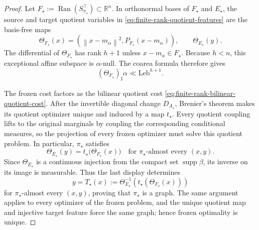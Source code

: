 \documentclass[11pt,a4paper]{article}
\theoremstyle{definition}
\theoremstyle{remark}
\newcommand{\R}{\mathbb R}
\newcommand{\supp}{\operatorname{supp}}
\newcommand{\Ran}{\operatorname{Ran}}
\newcommand{\norm}[1]{\left\lVert #1\right\rVert}
\begin{document}
\begin{proof}
Let \(F_\star:=\Ran(S_{\pi_\star}^\top)\subset\R^n\).  In orthonormal bases
of \(F_\star\) and \(E_\star\), the source and target quotient variables in
\eqref{eq:finite-rank-quotient-features} are the basis-free maps
\begin{equation*}
  \Theta_{F_\star}(x)
  =\left(\norm{x-m_\alpha}^2,P_{F_\star}(x-m_\alpha)\right),
  \qquad
  \Theta_{E_\star}(y).
\end{equation*}
The differential of \(\Theta_{F_\star}\) has rank \(h+1\) unless
\(x-m_\alpha\in F_\star\).  Because \(h<n\), this exceptional affine
subspace is \(\alpha\)-null.  The coarea formula therefore gives
\begin{equation*}
  (\Theta_{F_\star})_\sharp\alpha
  \ll\mathrm{Leb}^{h+1}.
\end{equation*}

The frozen cost factors as the bilinear quotient cost
\eqref{eq:finite-rank-bilinear-quotient-cost}.  After the invertible diagonal
change \(D_{A_\star}\), Brenier's theorem makes its quotient optimizer unique
and induced by a map \(t_\star\).  Every quotient coupling lifts to the
original marginals by coupling the corresponding conditional measures, so
the projection of every frozen optimizer must solve this quotient problem.
In particular, \(\pi_\star\) satisfies
\begin{equation*}
  \Theta_{E_\star}(y)
  =t_\star\bigl(\Theta_{F_\star}(x)\bigr)
  \quad\text{for \(\pi_\star\)-almost every \((x,y)\)}.
\end{equation*}
Since \(\Theta_{E_\star}\) is a continuous injection from the compact set
\(\supp\beta\), its inverse on its image is measurable.  Thus the last
display determines
\begin{equation*}
  y=T_\star(x)
  :=\Theta_{E_\star}^{-1}\!\left(
      t_\star(\Theta_{F_\star}(x))\right)
\end{equation*}
for \(\pi_\star\)-almost every \((x,y)\), proving that \(\pi_\star\) is a
graph.  The same argument applies to every optimizer of the frozen problem,
and the unique quotient map and injective target feature force the same
graph; hence frozen optimality is unique.
\end{proof}
\end{document}
